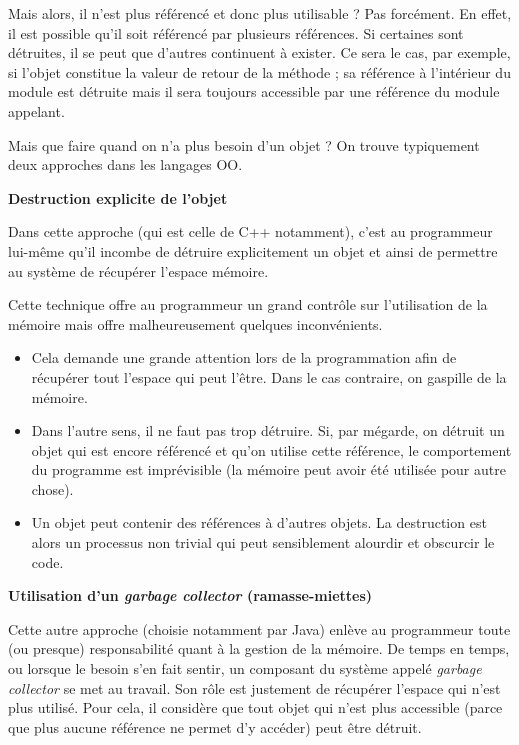{
Mais alors, il n’est plus référencé et donc plus utilisable ? Pas
forcément. En effet, il est possible qu’il soit référencé par plusieurs
références. Si certaines sont détruites, il se peut que d’autres
continuent à exister. Ce sera le cas, par exemple, si l’objet constitue
la valeur de retour de la méthode ; sa référence à l’intérieur du
module est détruite mais il sera toujours accessible par une référence
du module appelant.}

{
Mais que faire quand on n’a plus besoin d’un objet ? On trouve
typiquement deux approches dans les langages OO.}

{\sffamily\bfseries\upshape
Destruction explicite de l’objet}

{
Dans cette approche (qui est celle de C++ notamment), c’est au
programmeur lui-même qu’il incombe de détruire explicitement un objet
et ainsi de permettre au système de récupérer l’espace mémoire. }

{
Cette technique offre au programmeur un grand contrôle sur l’utilisation
de la mémoire mais offre malheureusement quelques inconvénients.}

\liststyleListv
\begin{itemize}
\item {
Cela demande une grande attention lors de la programmation afin de
récupérer tout l’espace qui peut l’être. Dans le cas contraire, on
gaspille de la mémoire.}
\item {
Dans l’autre sens, il ne faut pas trop détruire. Si, par mégarde, on
détruit un objet qui est encore référencé et qu'on
utilise cette référence, le comportement du programme est imprévisible
(la mémoire peut avoir été utilisée pour autre chose).}
\item {
Un objet peut contenir des références à d’autres objets. La destruction
est alors un processus non trivial qui peut sensiblement alourdir et
obscurcir le code.}
\end{itemize}
{\sffamily\bfseries\upshape
Utilisation d’un \textit{garbage collector} (ramasse-miettes)}

{
Cette autre approche (choisie notamment par Java) enlève au programmeur
toute (ou presque) responsabilité quant à la gestion de la mémoire. De
temps en temps, ou lorsque le besoin s’en fait sentir, un composant du
système appelé \textit{garbage collector} se met au travail. Son rôle
est justement de récupérer l’espace qui n’est plus utilisé. Pour cela,
il considère que tout objet qui n'est plus accessible
(parce que plus aucune référence ne permet d’y accéder) peut être
détruit.}

